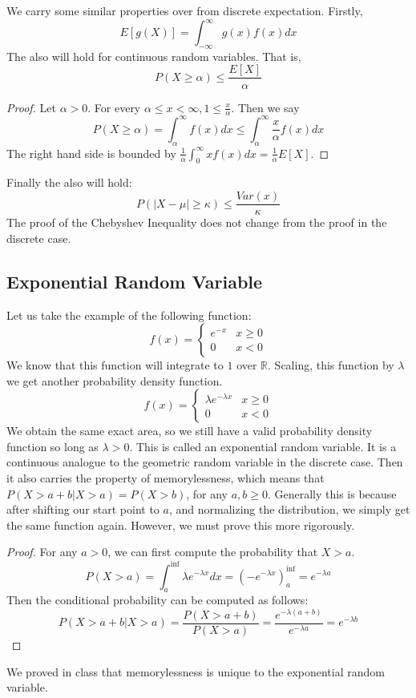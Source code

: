 \documentclass{article}
\theoremstyle{definition}
\begin{document}
    We carry some similar properties over from discrete expectation. Firstly,
    \[
        E[g(X)] = \int_{-\infty}^\infty g(x)f(x) dx    
    \]
    The  also will hold for continuous random variables. That is,
    \[
        P(X \geq \alpha) \leq \frac{E[X]}{\alpha}    
    \]
    \begin{proof}
        Let $\alpha > 0$. For every $\alpha \leq x < \infty, 1 \leq \frac{x}{\alpha}$. Then we say 
        \[
            P(X \geq \alpha) = \int_\alpha^\infty f(x) dx \leq \int_\alpha^\infty \frac{x}{\alpha}f(x)dx
        \]
        The right hand side is bounded by $\frac{1}{\alpha} \int_0^\infty x f(x) dx = \frac{1}{\alpha} E[X]$.
    \end{proof}
    Finally the  also will hold:
    \[
        P(|X - \mu| \geq \kappa) \leq \frac{Var(x)}{\kappa}
    \]
    The proof of the Chebyshev Inequality does not change from the proof in the discrete case.
    \subsection{Exponential Random Variable}
        Let us take the example of the following function:
        \[
            f(x) = \begin{cases}
                e^{-x} & x \geq 0\\
                0 & x < 0
            \end{cases}
        \]
        We know that this function will integrate to $1$ over $\mathbb{R}$.
        Scaling, this function by $\lambda$ we get another probability density function.
        \[ f(x) = \begin{cases}\lambda e^{-\lambda x} & x \geq 0\\ 0 & x < 0 \end{cases}\]
        We obtain the same exact area, so we still have a valid probability density function so
        long as $\lambda > 0$.
        This is called an exponential random variable.
        It is a continuous analogue to the geometric random variable in the discrete case. Then
        it also carries the property of memorylessness, which means that $P(X > a + b | X > a) = P(X > b)$,
        for any $a,b \geq 0$. Generally this is because after shifting our start point to $a$, and normalizing the distribution,
        we simply get the same function again. However, we must prove this more rigorously.
        \begin{proof}
            For any $a > 0$, we can first compute the probability that $X > a$.
            \[
                P(X > a) = \int_a^{\inf} \lambda e^{- \lambda x} dx = (-e^{-\lambda x})_a^{\inf} = e^{-\lambda a}
            \]
            Then the conditional probability can be computed as follows:
            \[
                P(X > a + b | X > a) = \frac{P(X > a + b)}{P(X > a)} = \frac{e^{-\lambda (a + b)}}{e^{-\lambda a}} = e^{-\lambda b}
            \]
        \end{proof}
        We proved in class that memorylessness is unique to the exponential random variable.
\end{document}
